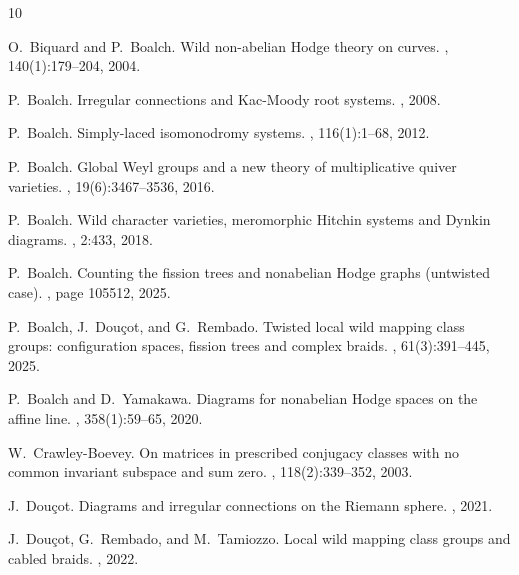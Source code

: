 \documentclass[11pt,a4paper]{amsart}
\numberwithin{equation}{section}
\begin{document}
\begin{thebibliography}{10}

O.~Biquard and P.~Boalch.
\newblock Wild non-abelian {H}odge theory on curves.
, 140(1):179--204, 2004.

P.~Boalch.
\newblock Irregular connections and {K}ac-{M}oody root systems.
, 2008.

P.~Boalch.
\newblock Simply-laced isomonodromy systems.
, 116(1):1--68,
  2012.

P.~Boalch.
\newblock Global {W}eyl groups and a new theory of multiplicative quiver
  varieties.
, 19(6):3467--3536, 2016.

P.~Boalch.
\newblock Wild character varieties, meromorphic {H}itchin systems and {D}ynkin
  diagrams.
, 2:433, 2018.

P.~Boalch.
\newblock Counting the fission trees and nonabelian {H}odge graphs (untwisted
  case).
, page 105512, 2025.

P.~Boalch, J.~Dou{\c{c}}ot, and G.~Rembado.
\newblock Twisted local wild mapping class groups: configuration spaces,
  fission trees and complex braids.
, 61(3):391–445, 2025.

P.~Boalch and D.~Yamakawa.
\newblock Diagrams for nonabelian {H}odge spaces on the affine line.
, 358(1):59--65, 2020.

W.~Crawley-Boevey.
\newblock On matrices in prescribed conjugacy classes with no common invariant
  subspace and sum zero.
, 118(2):339--352, 2003.

J.~Dou{\c{c}}ot.
\newblock Diagrams and irregular connections on the {R}iemann sphere.
, 2021.

J.~Dou{\c{c}}ot, G.~Rembado, and M.~Tamiozzo.
\newblock Local wild mapping class groups and cabled braids.
, 2022.


\end{thebibliography}
\end{document}
